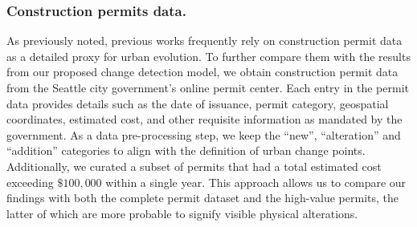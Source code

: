 \documentclass[letterpaper]{article} %
\begin{document}
\subsubsection{Construction permits data.}
As previously noted, previous works frequently rely on construction permit data as a detailed proxy for urban evolution. To further compare them with the results from our proposed change detection model, we obtain construction permit data from the Seattle city government's online permit center.
Each entry in the permit data provides details such as the date of issuance, permit category, geospatial coordinates, estimated cost, and other requisite information as mandated by the government.
As a data pre-processing step, we keep the ``new'', ``alteration'' and ``addition'' categories to align with the definition of urban change points. Additionally, we curated a subset of permits that had a total estimated cost exceeding $\$100,000$ within a single year. This approach allows us to compare our findings with both the complete permit dataset and the high-value permits, the latter of which are more probable to signify visible physical alterations.


\end{document}
